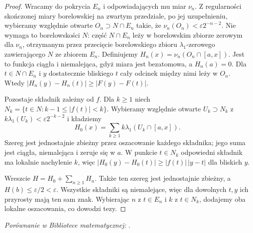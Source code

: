 \begin{proof}
Wracamy do pokrycia $E_n$ i odpowiadających mu miar $\nu_n$.
Z regularności skończonej miary borelowskiej na zwartym
przedziale, po jej uzupełnieniu, wybieramy względnie
otwarte $O_n\supset N\cap E_n$ takie, że
$\nu_n(O_n)<\varepsilon2^{-n-2}$. Nie wymaga to
borelowskości $N$: część $N\cap E_n$ leży w borelowskim
zbiorze zerowym dla $\nu_n$, otrzymanym przez przecięcie
borelowskiego zbioru $\lambda_1$-zerowego zawierającego $N$
ze zbiorem $E_n$.
Definiujemy $H_n(x)=\nu_n(O_n\cap[a,x])$.
Jest to funkcja ciągła i niemalejąca, gdyż miara jest
bezatomowa, a $H_n(a)=0$. Dla $t\in N\cap E_n$ i $y$
dostatecznie bliskiego $t$ cały odcinek między nimi leży
w $O_n$. Wtedy
$|H_n(y)-H_n(t)|\ge |F(y)-F(t)|$.

Pozostaje składnik zależny od $f$. Dla $k\ge1$ niech
$N_k=\{t\in N:k-1\le |f(t)|<k\}$. Wybieramy względnie
otwarte $U_k\supset N_k$ z
$k\lambda_1(U_k)<\varepsilon2^{-k-2}$ i kładziemy
\[
 H_0(x)=\sum_{k\ge1} k\lambda_1(U_k\cap[a,x]).
\]
Szereg jest jednostajnie zbieżny przez oszacowanie
każdego składnika; jego suma jest ciągła, niemalejąca
i zeruje się w $a$. W punkcie $t\in N_k$ odpowiedni
składnik ma lokalnie nachylenie $k$, więc
$|H_0(y)-H_0(t)|\ge |f(t)|\,|y-t|$ dla bliskich $y$.

Wreszcie $H=H_0+\sum_{n\ge1}H_n$. Także ten szereg jest
jednostajnie zbieżny, a $H(b)\le\varepsilon/2<\varepsilon$.
Wszystkie składniki są niemalejące, więc dla dowolnych
$t,y$ ich przyrosty mają ten sam znak. Wybierając $n$
z $t\in E_n$ i $k$ z $t\in N_k$, dodajemy oba lokalne
oszacowania, co dowodzi tezy.
\end{proof}

\noindent\emph{Porównanie w Bibliotece matematycznej:} .

